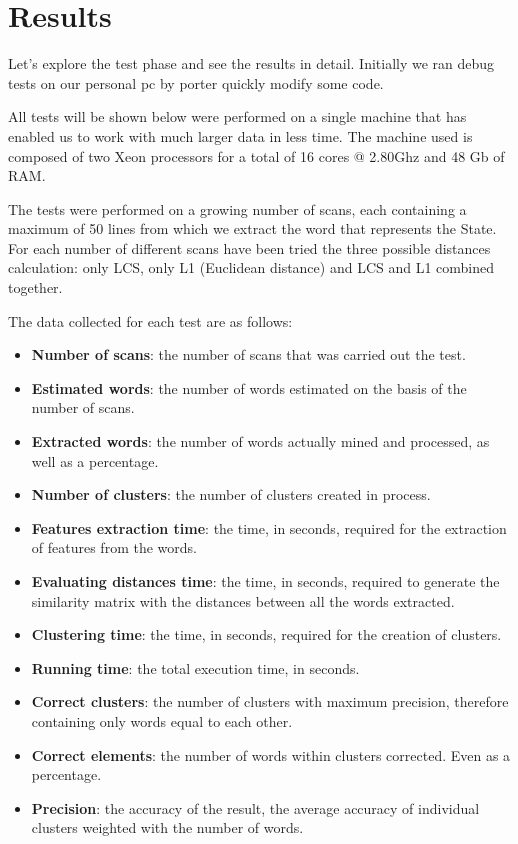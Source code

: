 \section{Results}

Let's explore the test phase and see the results in detail. Initially we ran debug tests on our personal pc by porter quickly modify some code.

All tests will be shown below were performed on a single machine that has enabled us to work with much larger data in less time. The machine used is composed of two Xeon processors for a total of 16 cores @ 2.80Ghz and 48 Gb of RAM.

The tests were performed on a growing number of scans, each containing a maximum of 50 lines from which we extract the word that represents the State. For each number of different scans have been tried the three possible distances calculation: only LCS, only L1 (Euclidean distance) and LCS and L1 combined together.

The data collected for each test are as follows:
\begin{itemize}
\item \textbf{Number of scans}: the number of scans that was carried out the test.
\item \textbf{Estimated words}: the number of words estimated on the basis of the number of scans.
\item\textbf{Extracted words}: the number of words actually mined and processed, as well as a percentage.
\item \textbf{Number of clusters}: the number of clusters created in process.
\item \textbf{Features extraction time}: the time, in seconds, required for the extraction of features from the words.
\item \textbf{Evaluating distances time}: the time, in seconds, required to generate the similarity matrix with the distances between all the words extracted.
\item \textbf{Clustering time}: the time, in seconds, required for the creation of clusters.
\item \textbf{Running time}: the total execution time, in seconds.
\item \textbf{Correct clusters}: the number of clusters with maximum precision, therefore containing only words equal to each other.
\item \textbf{Correct elements}: the number of words within clusters corrected. Even as a percentage.
\item \textbf{Precision}: the accuracy of the result, the average accuracy of individual clusters weighted with the number of words.
\end{itemize}

